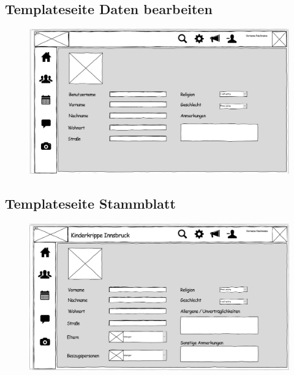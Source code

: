   \subsection{Templateseite Daten bearbeiten}
 \begin{figure}[ht!]
  \includegraphics[width = 150mm]{pictures/daten_bearbeiten.PNG}
 \end{figure}
 
  \newpage
 \subsection{Templateseite Stammblatt}
 \begin{figure}[ht!]
  \includegraphics[width = 150mm]{pictures/Stammblattseite.PNG}
 \end{figure}
 
